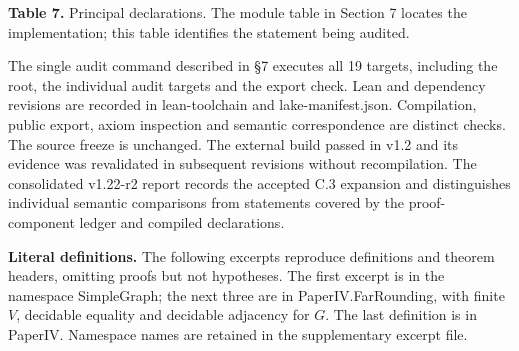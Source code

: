 \documentclass[english,11pt,a4paper]{article}
\begin{document}
\textbf{Table 7.} Principal declarations. The module table in Section 7 locates the implementation; this table identifies the statement being audited.

The single audit command described in §7 executes all 19 targets, including the root, the individual audit targets and the export check. Lean and dependency revisions are recorded in lean-toolchain and lake-manifest.json. Compilation, public export, axiom inspection and semantic correspondence are distinct checks. The source freeze is unchanged. The external build passed in v1.2 and its evidence was revalidated in subsequent revisions without recompilation. The consolidated v1.22-r2 report records the accepted C.3 expansion and distinguishes individual semantic comparisons from statements covered by the proof-component ledger and compiled declarations.

\textbf{Literal definitions.} The following excerpts reproduce definitions and theorem headers, omitting proofs but not hypotheses. The first excerpt is in the namespace {\ttfamily\small SimpleGraph}; the next three are in {\ttfamily\small PaperIV.\discretionary{\hbox{\ensuremath{\hookrightarrow}}}{}{}FarRounding}, with finite \(V\), decidable equality and decidable adjacency for \(G\). The last definition is in {\ttfamily\small PaperIV}. Namespace names are retained in the supplementary excerpt file.
\end{document}
